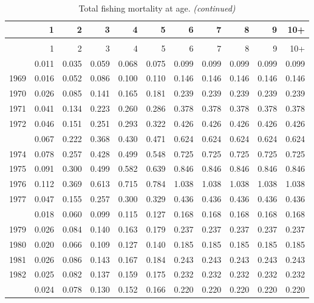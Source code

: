 \documentclass[
]{article}
\begin{document}
\begin{longtable}[t]{lrrrrrrrrrr}
\caption{\label{tab:FAA-tot-table}Total fishing mortality at age.}\\
\toprule
  & 1 & 2 & 3 & 4 & 5 & 6 & 7 & 8 & 9 & 10+\\
\midrule
\endfirsthead
\caption[]{Total fishing mortality at age. \textit{(continued)}}\\
\toprule
  & 1 & 2 & 3 & 4 & 5 & 6 & 7 & 8 & 9 & 10+\\
\midrule
\endhead

\endfoot
\bottomrule
\endlastfoot
1968 & 0.011 & 0.035 & 0.059 & 0.068 & 0.075 & 0.099 & 0.099 & 0.099 & 0.099 & 0.099\\
1969 & 0.016 & 0.052 & 0.086 & 0.100 & 0.110 & 0.146 & 0.146 & 0.146 & 0.146 & 0.146\\
1970 & 0.026 & 0.085 & 0.141 & 0.165 & 0.181 & 0.239 & 0.239 & 0.239 & 0.239 & 0.239\\
1971 & 0.041 & 0.134 & 0.223 & 0.260 & 0.286 & 0.378 & 0.378 & 0.378 & 0.378 & 0.378\\
1972 & 0.046 & 0.151 & 0.251 & 0.293 & 0.322 & 0.426 & 0.426 & 0.426 & 0.426 & 0.426\\
\addlinespace
1973 & 0.067 & 0.222 & 0.368 & 0.430 & 0.471 & 0.624 & 0.624 & 0.624 & 0.624 & 0.624\\
1974 & 0.078 & 0.257 & 0.428 & 0.499 & 0.548 & 0.725 & 0.725 & 0.725 & 0.725 & 0.725\\
1975 & 0.091 & 0.300 & 0.499 & 0.582 & 0.639 & 0.846 & 0.846 & 0.846 & 0.846 & 0.846\\
1976 & 0.112 & 0.369 & 0.613 & 0.715 & 0.784 & 1.038 & 1.038 & 1.038 & 1.038 & 1.038\\
1977 & 0.047 & 0.155 & 0.257 & 0.300 & 0.329 & 0.436 & 0.436 & 0.436 & 0.436 & 0.436\\
\addlinespace
1978 & 0.018 & 0.060 & 0.099 & 0.115 & 0.127 & 0.168 & 0.168 & 0.168 & 0.168 & 0.168\\
1979 & 0.026 & 0.084 & 0.140 & 0.163 & 0.179 & 0.237 & 0.237 & 0.237 & 0.237 & 0.237\\
1980 & 0.020 & 0.066 & 0.109 & 0.127 & 0.140 & 0.185 & 0.185 & 0.185 & 0.185 & 0.185\\
1981 & 0.026 & 0.086 & 0.143 & 0.167 & 0.184 & 0.243 & 0.243 & 0.243 & 0.243 & 0.243\\
1982 & 0.025 & 0.082 & 0.137 & 0.159 & 0.175 & 0.232 & 0.232 & 0.232 & 0.232 & 0.232\\
\addlinespace
1983 & 0.024 & 0.078 & 0.130 & 0.152 & 0.166 & 0.220 & 0.220 & 0.220 & 0.220 & 0.220\\

\end{longtable}
\end{document}
